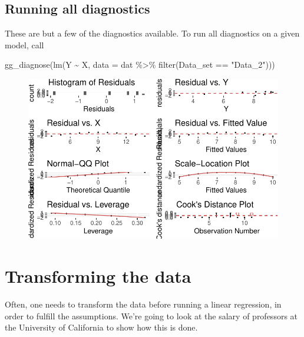 \documentclass[
  letterpaper,
  DIV=11,
  numbers=noendperiod]{scrreprt}
\newenvironment{Shaded}{\begin{snugshade}}{\end{snugshade}}
\newcommand{\AttributeTok}[1]{\textcolor[rgb]{0.40,0.45,0.13}{#1}}
\newcommand{\FunctionTok}[1]{\textcolor[rgb]{0.28,0.35,0.67}{#1}}
\newcommand{\NormalTok}[1]{\textcolor[rgb]{0.00,0.23,0.31}{#1}}
\newcommand{\SpecialCharTok}[1]{\textcolor[rgb]{0.37,0.37,0.37}{#1}}
\newcommand{\StringTok}[1]{\textcolor[rgb]{0.13,0.47,0.30}{#1}}
\begin{document}
\hypertarget{running-all-diagnostics}{%
\subsection{Running all diagnostics}\label{running-all-diagnostics}}

These are but a few of the diagnostics available. To run all diagnostics
on a given model, call

\begin{Shaded}
\begin{Highlighting}[]
\FunctionTok{gg\_diagnose}\NormalTok{(}\FunctionTok{lm}\NormalTok{(Y }\SpecialCharTok{\textasciitilde{}}\NormalTok{ X, }\AttributeTok{data =}\NormalTok{ dat }\SpecialCharTok{\%\textgreater{}\%} \FunctionTok{filter}\NormalTok{(Data\_set }\SpecialCharTok{==} \StringTok{"Data\_2"}\NormalTok{)))}
\end{Highlighting}
\end{Shaded}

\begin{figure}[H]

{\centering \includegraphics{./08-linearreg_files/figure-pdf/unnamed-chunk-30-1.pdf}

}

\end{figure}

\hypertarget{transforming-the-data}{%
\section{Transforming the data}\label{transforming-the-data}}

Often, one needs to transform the data before running a linear
regression, in order to fulfill the assumptions. We're going to look at
the salary of professors at the University of California to show how
this is done.
\end{document}
